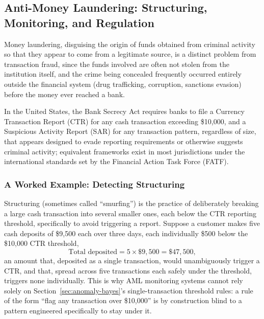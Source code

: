 \documentclass[../ai_in_finance]{subfiles}
\begin{document}
\subsection{Anti-Money Laundering: Structuring, Monitoring, and Regulation}
\label{sec:aml-structuring}

Money laundering, disguising the origin of funds obtained from criminal activity so that they appear to come from a legitimate source, is a distinct problem from transaction fraud, since the funds involved are often not stolen from the institution itself, and the crime being concealed frequently occurred entirely outside the financial system (drug trafficking, corruption, sanctions evasion) before the money ever reached a bank.

In the United States, the Bank Secrecy Act requires banks to file a Currency Transaction Report (CTR) for any cash transaction exceeding \$10,000, and a Suspicious Activity Report (SAR) for any transaction pattern, regardless of size, that appears designed to evade reporting requirements or otherwise suggests criminal activity; equivalent frameworks exist in most jurisdictions under the international standards set by the Financial Action Task Force (FATF).

\subsubsection*{A Worked Example: Detecting Structuring}

Structuring (sometimes called ``smurfing'') is the practice of deliberately breaking a large cash transaction into several smaller ones, each below the CTR reporting threshold, specifically to avoid triggering a report. Suppose a customer makes five cash deposits of \$9,500 each over three days, each individually \$500 below the \$10,000 CTR threshold,
\begin{equation*}
\text{Total deposited} = 5 \times \$9{,}500 = \$47{,}500,
\end{equation*}
an amount that, deposited as a single transaction, would unambiguously trigger a CTR, and that, spread across five transactions each safely under the threshold, triggers none individually. This is why AML monitoring systems cannot rely solely on Section~\ref{sec:anomaly-bayes}'s single-transaction threshold rules: a rule of the form ``flag any transaction over \$10,000'' is by construction blind to a pattern engineered specifically to stay under it.
\end{document}
